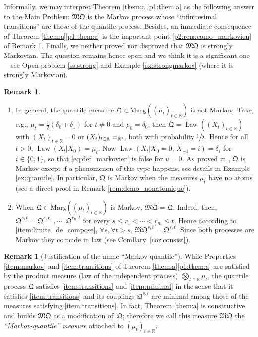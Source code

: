 \documentclass[11pt]{article}
\makeatletter
\newcommand{\skpt}{\smallskip}
\newcommand{\ldot}{\mathbin{.}}
\newcommand{\lcdots}{\ldot\cdots\ldot}
\DeclareRobustCommand{\mathbbm}[1]{\csname jepbb@#1\endcsname}
\theoremstyle{plain}
\theoremstyle{definition}
\newtheorem{rem}[them]{Remark}
\newcommand{\como}{\mathfrak{Q}}
\newcommand{\mq}{\mathfrak{MQ}}
\newcommand{\one}{\mathbbm{1}}
\newcommand{\ma}{\mathrm{Marg}}
\newcommand{\R}{\mathbb{R}}
\newcommand{\law}{\operatorname{Law}}
\makeatother
\begin{document}
Informally, we may interpret Theorem \ref{them:a}\eqref{p1:them:a} as the following answer to the Main Problem: $\mq$ is the Markov process whose ``infinitesimal transitions'' are those of the quantile process. Besides, an immediate consequence of Theorem \ref{them:a}\eqref{p1:them:a} is the important point \eqref{p2:rem:como_markovien} of Remark \ref{rem:como_markovien}. Finally, we neither proved nor disproved that $\mq$ is strongly Markovian. The question remains hence open and we think it is a significant one---see Open problem \ref{ss:strong} and Example \ref{ex:strongmarkov} (where it is strongly Markovian).

\skpt
\begin{rem}\label{rem:como_markovien}
\begin{enumerate}
\item
\label{p1:rem:como_markovien} In general, the quantile measure $\como\in\ma((\mu_t)_{t\in \R})$ is not Markov. Take, e.g., $\mu_t=\frac12(\delta_0+\delta_1)$ for $t\neq0$ and $\mu_0=\delta_0$, then $\como=\law((X_t)_{t\in\R})$ with $(X_t)_{t\in\R}=0$ or $(X_t)_{t\in\R}=\one_{\R^\ast}$, both with probability $\sfrac12$. Hence for all $t>0$, $\law(X_t|X_0)=\mu_t$. Now $\law(X_t|X_0=0,\,X_{-1}=i)=\delta_i$ for $i\in\{0,1\}$, so that \eqref{eq:def_markovien} is false for $u=0$. As~proved in \cite[Prop.\,3]{Ju_seminaire}, $\como$ is Markov except if a phenomenon of this type happens, see details in Example \ref{ex:quantile}.
In particular, $\como$ is Markov when the measures $\mu_t$ have no atoms (see a direct proof in Remark \ref{rem:demo_nonatomique}).

\item\label{p2:rem:como_markovien} When $\como\in\ma((\mu_t)_{t\in \R})$ is Markov, $\mq=\como$. Indeed, then, $\como^{s,t}=\como^{s,r_1}\lcdots \como^{r_n,t}$ for every $s\leq r_1<\cdots<r_m\leq t$. Hence according to \eqref{item:limite_de_compose}, $\forall s, \forall t>s$, $\mq^{s,t}=\como^{s,t}$. Since both processes are Markov they coincide in law (see Corollary~\ref{cor:consist}).
\end{enumerate}
\end{rem}

\begin{rem}[Justification of the name ``Markov-quantile'']While Properties \eqref{item:markov} and \eqref{item:transitions} of Theorem \ref{them:a}\eqref{p1:them:a} are satisfied by the product measure (law of the independent process) $\bigotimes_{t\in \R} \mu_t$, the quantile process $\como$ satisfies \eqref{item:transitions} and \eqref{item:minimal} in the sense that it satisfies \eqref{item:transitions} and its couplings $\como^{s,t}$ are minimal among those of the measures satisfying \eqref{item:transitions}. In fact, Theorem \ref{them:a} is constructive and builds $\mq$ as a modification of~$\como$; therefore we call this measure $\mq$ the \emph{``Markov-quantile'' measure} attached to $(\mu_t)_{t\in\R}$.
\end{rem}
\end{document}
